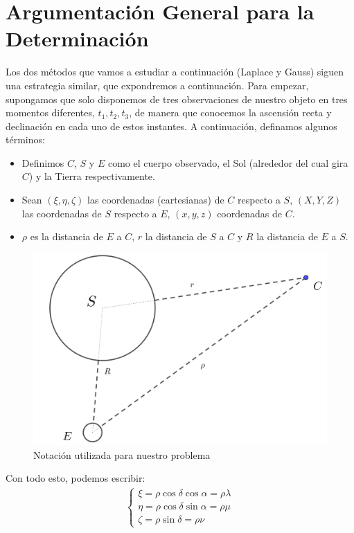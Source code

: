 \documentclass[11pt]{article}
\begin{document}
\section{Argumentación General para la Determinación}
Los dos métodos que vamos a estudiar a continuación (Laplace y Gauss) siguen una estrategia similar, que expondremos a continuación. Para empezar, supongamos que solo disponemos de tres observaciones de nuestro objeto en tres momentos diferentes, $t_1, t_2, t_3$, de manera que conocemos la ascensión recta y declinación en cada uno de estos instantes. A continuación, definamos algunos términos:
\begin{itemize}
\item Definimos $C$, $S$ y $E$ como el cuerpo observado, el Sol (alrededor del cual gira $C$) y la Tierra respectivamente.
\item Sean $(\xi,\eta,\zeta)$ las coordenadas (cartesianas) de $C$ respecto a $S$, $(X,Y,Z)$ las coordenadas de $S$ respecto a $E$, $(x,y,z)$ coordenadas de $C$.
\item $\rho$ es la distancia de $E$ a $C$, $r$ la distancia de $S$ a $C$ y $R$ la distancia de $E$ a $S$.
\end{itemize}

\begin{figure}[H]
\centering
\includegraphics[scale=0.15]{images/notation.png}
\caption{Notación utilizada para nuestro problema}
\label{fig:notation}
\end{figure}

Con todo esto, podemos escribir:
\begin{align}
\left\{
\begin{array}{l}
\xi = \rho \cos{\delta}\cos{\alpha} = \rho\lambda\\
\eta = \rho \cos{\delta}\sin{\alpha} = \rho\mu\\
\zeta = \rho \sin{\delta} = \rho\nu
\end{array}
\right.
\label{eq:terminologia}
\end{align}
\end{document}
